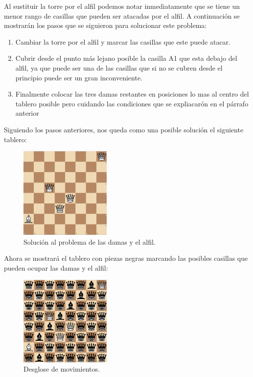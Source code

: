 \documentclass[12pt]{article}
\begin{document}
Al sustituir la torre por el alfil podemos notar inmediatamente que se tiene un menor rango de casillas que pueden ser atacadas por el alfil. A continuación se mostrarán los pasos que se siguieron para solucionar este problema:

\begin{enumerate}
    \item Cambiar la torre por el alfil y marcar las casillas que este puede atacar.
    \item Cubrir desde el punto más lejano posible la casilla A1 que esta debajo del alfil, ya que puede ser una de las casillas que si no se cubren desde el principio puede ser un gran inconveniente.
    \item Finalmente colocar las tres damas restantes en posiciones lo mas al centro del tablero posible pero cuidando las condiciones que se expliacarón en el párrafo anterior
\end{enumerate}

Siguiendo los pasos anteriores, nos queda como una posible solución el siguiente tablero:

\begin{figure}[h]
\centering
\includegraphics[width=0.4\textwidth]{2.png}
\caption{\label{fig:xx}Solución al problema de las damas y el alfil.}
\end{figure}

Ahora se mostrará el tablero con piezas negras marcando las posibles casillas que pueden ocupar las damas y el alfil:

\begin{figure}[h]
\centering
\includegraphics[width=0.4\textwidth]{3.png}
\caption{\label{fig:xx}Desglose de movimientos.}
\end{figure}
\end{document}
